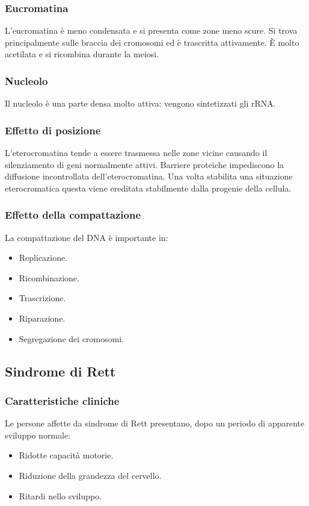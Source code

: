 		\subsubsection{Eucromatina}
		L'eucromatina \`e meno condensata e si presenta come zone meno scure.
		Si trova principalmente sulle braccia dei cromosomi ed \`e trascritta attivamente.
		\`E molto acetilata e si ricombina durante la meiosi.

		\subsubsection{Nucleolo}
		Il nucleolo \`e una parte densa molto attiva: vengono sintetizzati gli rRNA.

		\subsubsection{Effetto di posizione}
		L'eterocromatina tende a essere trasmessa nelle zone vicine causando il silenziamento di geni normalmente attivi.
		Barriere proteiche impediscono la diffusione incontrollata dell'eterocromatina.
		Una volta stabilita una situazione eterocromatica questa viene ereditata stabilmente dalla progenie della cellula.

		\subsubsection{Effetto della compattazione}
		La compattazione del DNA \`e importante in:
		\begin{multicols}{3}
			\begin{itemize}
				\item Replicazione.
				\item Ricombinazione.
				\item Trascrizione.
				\item Riparazione.
				\item Segregazione dei cromosomi.
			\end{itemize}
		\end{multicols}

	\subsection{Sindrome di Rett}
	
		\subsubsection{Caratteristiche cliniche}
		Le persone affette da sindrome di Rett presentano, dopo un periodo di apparente sviluppo normale:
		\begin{multicols}{3}
			\begin{itemize}
				\item Ridotte capacit\`a motorie.
				\item Riduzione della grandezza del cervello.
				\item Ritardi nello sviluppo.
			\end{itemize}
		\end{multicols}

